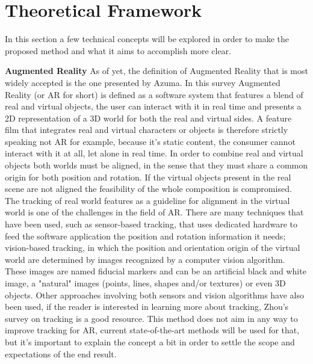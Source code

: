 \documentclass{article}
\begin{document}
\section{Theoretical Framework}
In this section a few technical concepts will be explored in order to make the proposed method and what it aims to accomplish more clear.

\textbf{Augmented Reality}\newline
As of yet, the definition of Augmented Reality that is most widely accepted is the one presented by Azuma\cite{azuma1997}. In this survey Augmented Reality (or AR for short) is defined as a software system that features a blend of real and virtual objects, the user can interact with it in real time and presents a 2D representation of a 3D world for both the real and virtual sides. A feature film that integrates real and virtual characters or objects is therefore strictly speaking not AR for example, because it's static content, the consumer cannot interact with it at all, let alone in real time.
In order to combine real and virtual objects both worlds must be aligned, in the sense that they must share a common origin for both position and rotation. If the virtual objects present in the real scene are not aligned the feasibility of the whole composition is compromised. The tracking of real world features as a guideline for alignment in the virtual world is one of the challenges in the field of AR. There are many techniques that have been used, such as sensor-based tracking, that uses dedicated hardware to feed the software application the position and rotation information it needs; vision-based tracking, in which the position and orientation origin of the virtual world are determined by images recognized by a computer vision algorithm. These images are named fiducial markers and can be an artificial black and white image, a "natural" images (points, lines, shapes and/or textures) or even 3D objects. Other approaches involving both sensors and vision algorithms have also been used, if the reader is interested in learning more about tracking, Zhou's survey\cite{zhou2008} on tracking is a good resource.
This method does not aim in any way to improve tracking for AR, current state-of-the-art methods will be used for that, but it's important to explain the concept a bit in order to settle the scope and expectations of the end result.
\end{document}
